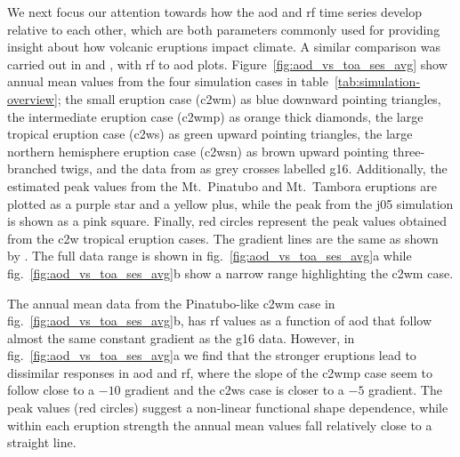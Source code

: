 \documentclass{ametsocV6.1}
\begin{document}
We next focus our attention towards how the \gls{aod} and \gls{rf} time series develop
relative to each other, which are both parameters commonly used for providing insight
about how volcanic eruptions impact climate. A similar comparison was carried out in
\citet[][their Fig.\ 4]{gregory2016} and \citet[][their Fig.\ 1]{marshall2020}, with
\gls{rf} to \gls{aod} plots. Figure~\ref{fig:aod_vs_toa_ses_avg} show annual mean values
from the four simulation cases in table~\ref{tab:simulation-overview}; the small
eruption case (\gls{c2wm}) as blue downward pointing triangles, the intermediate
eruption case (\gls{c2wmp}) as orange thick diamonds, the large tropical eruption case
(\gls{c2ws}) as green upward pointing triangles, the large northern hemisphere eruption
case (\gls{c2wsn}) as brown upward pointing three-branched twigs, and the data from
\citet[][Fig.\ 4, black crosses from HadCM3 sstPiHistVol]{gregory2016} as grey crosses
labelled \gls{g16}. Additionally, the estimated peak values from the Mt.\
Pinatubo and Mt.\ Tambora eruptions are plotted as a purple star and a yellow plus,
while the peak from the \gls{j05} simulation is shown as a pink square. Finally, red
circles represent the peak values obtained from the \gls{c2w} tropical eruption cases.
The gradient lines are the same as shown by \citet{gregory2016}. The full data range is
shown in fig.~\ref{fig:aod_vs_toa_ses_avg}a while fig.~\ref{fig:aod_vs_toa_ses_avg}b
show a narrow range highlighting the \gls{c2wm} case.

The annual mean data from the Pinatubo-like \gls{c2wm} case in
fig.~\ref{fig:aod_vs_toa_ses_avg}b, has \gls{rf} values as a function of \gls{aod} that
follow almost the same constant gradient as the \gls{g16} data. However, in
fig.~\ref{fig:aod_vs_toa_ses_avg}a we find that the stronger eruptions lead to
dissimilar responses in \gls{aod} and \gls{rf}, where the slope of the \gls{c2wmp} case
seem to follow close to a \(-10\) gradient and the \gls{c2ws} case is closer to a \(-5\)
gradient. The peak values (red circles) suggest a non-linear functional shape
dependence, while within each eruption strength the annual mean values fall relatively
close to a straight line.
\end{document}
